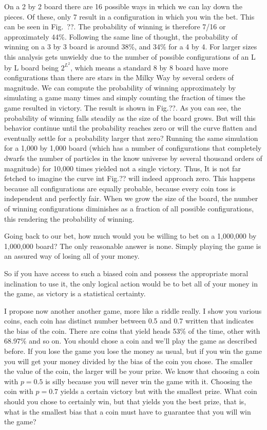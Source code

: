 On a 2 by 2 board there are 16 possible ways in which we can lay down the
pieces. Of these, only 7 result in a configuration in which you win the bet.
This can be seen in Fig.~??. The probability of winning is therefore 7/16 or
approximately 44\%. Following the same line of thought, the probability of
winning on a 3 by 3 board is around 38\%, and 34\% for a 4 by 4. For larger
sizes this analysis gets unwieldy due to the number of possible configurations
of an L by L board being $2^{L^2}$, which means a standard 8 by 8 board have
more configurations than there are stars in the Milky Way by several orders of
magnitude. We can compute the probability of winning approximately by
simulating a game many times and simply counting the fraction of times the game
resulted in victory. The result is shown in Fig.??. As you can see, the
probability of winning falls steadily as the size of the board grows. But will
this behavior continue until the probability reaches zero or will the curve
flatten and eventually settle for a probability larger that zero? Running the
same simulation for a 1,000 by 1,000 board (which has a number of
configurations that completely dwarfs the number of particles in the know
universe by several thousand orders of magnitude) for 10,000 times yielded not
a single victory. Thus, It is not far fetched to imagine the curve int Fig.??
will indeed approach zero.
This happens because all configurations are equally probable, because every
coin toss is independent and perfectly fair. When we grow the size of the
board, the number of winning configurations diminishes as a fraction of all
possible configurations, this rendering the probability of winning.

Going back to our bet, how much would you be willing to bet on a 1,000,000 by
1,000,000 board? The only reasonable answer is none. Simply playing the game 
is an assured way of losing all of your money.


So if you have access to such a biased coin and possess the appropriate moral
inclination to use it, the only logical action would be to bet all of your
money in the game, as victory is a statistical certainty. 

I propose now another another game, more like a riddle really. I show you
various coins, each coin has distinct number between 0.5 and 0.7 written that
indicates the bias of the coin. There are coins that yield heads 53\% of the
time, other with 68.97\% and so on. You should chose a coin and we'll play the
game as described before. If you lose the game you lose the money as usual, but
if you win the game you will get your money divided by the bias of the coin you
chose. The smaller the value of the coin, the larger will be your prize. We
know that choosing a coin with $p=0.5$ is silly because you will never win
the game with it. Choosing the coin with $p=0.7$ yields a certain victory but
with the smallest prize. What coin should you chose to certainly win, but
that yields you the best prize, that is, what is the smallest bias that a
coin must have to guarantee that you will win the game?

